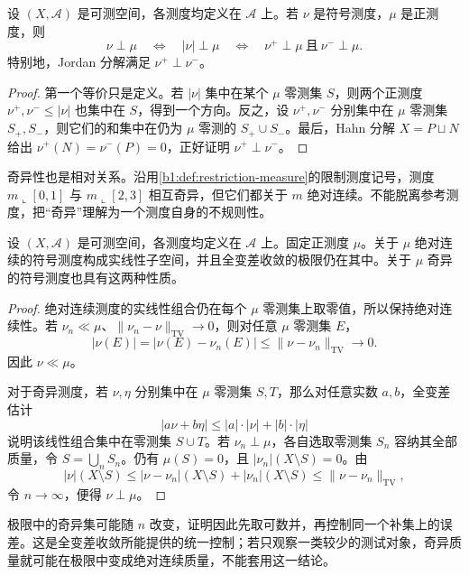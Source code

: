 \begin{proposition}\label{b1:prop:singularity-jordan}
设 \((X,\mathcal A)\) 是可测空间，各测度均定义在 \(\mathcal A\) 上。若 \(\nu\) 是符号测度，\(\mu\) 是正测度，则
\[
\nu\perp\mu\quad\Longleftrightarrow\quad|\nu|\perp\mu
\quad\Longleftrightarrow\quad\nu^+\perp\mu\ \text{且}\ \nu^-\perp\mu.
\]
特别地，Jordan 分解满足 \(\nu^+\perp\nu^-\)。
\end{proposition}
\begin{proof}
第一个等价只是定义。若 \(|\nu|\) 集中在某个 \(\mu\) 零测集 \(S\)，则两个正测度 \(\nu^+,\nu^-\leq|\nu|\) 也集中在 \(S\)，得到一个方向。反之，设 \(\nu^+,\nu^-\) 分别集中在 \(\mu\) 零测集 \(S_+,S_-\)，则它们的和集中在仍为 \(\mu\) 零测的 \(S_+\cup S_-\)。最后，Hahn 分解 \(X=P\sqcup N\) 给出 \(\nu^+(N)=\nu^-(P)=0\)，正好证明 \(\nu^+\perp\nu^-\)。
\end{proof}

奇异性也是相对关系。沿用\cref{b1:def:restriction-measure}的限制测度记号，测度 \(m\llcorner[0,1]\) 与 \(m\llcorner[2,3]\) 相互奇异，但它们都关于 \(m\) 绝对连续。不能脱离参考测度，把“奇异”理解为一个测度自身的不规则性。

\begin{proposition}\label{b1:prop:ac-singular-linear-stability}
设 \((X,\mathcal A)\) 是可测空间，各测度均定义在 \(\mathcal A\) 上。固定正测度 \(\mu\)。关于 \(\mu\) 绝对连续的符号测度构成实线性子空间，并且全变差收敛的极限仍在其中。关于 \(\mu\) 奇异的符号测度也具有这两种性质。
\end{proposition}
\begin{proof}
绝对连续测度的实线性组合仍在每个 \(\mu\) 零测集上取零值，所以保持绝对连续性。若 \(\nu_n\ll\mu\)、\(\|\nu_n-\nu\|_{\mathrm{TV}}\to0\)，则对任意 \(\mu\) 零测集 \(E\)，
\[
|\nu(E)|=|\nu(E)-\nu_n(E)|\leq\|\nu-\nu_n\|_{\mathrm{TV}}\longrightarrow0.
\]
因此 \(\nu\ll\mu\)。

对于奇异测度，若 \(\nu,\eta\) 分别集中在 \(\mu\) 零测集 \(S,T\)，那么对任意实数 \(a,b\)，全变差估计
\[
|a\nu+b\eta|\leq|a|\cdot|\nu|+|b|\cdot|\eta|
\]
说明该线性组合集中在零测集 \(S\cup T\)。若 \(\nu_n\perp\mu\)，各自选取零测集 \(S_n\) 容纳其全部质量，令 \(S=\bigcup_nS_n\)。仍有 \(\mu(S)=0\)，且 \(|\nu_n|(X\setminus S)=0\)。由
\[
|\nu|(X\setminus S)
\leq|\nu-\nu_n|(X\setminus S)+|\nu_n|(X\setminus S)
\leq\|\nu-\nu_n\|_{\mathrm{TV}},
\]
令 \(n\to\infty\)，便得 \(\nu\perp\mu\)。
\end{proof}

极限中的奇异集可能随 \(n\) 改变，证明因此先取可数并，再控制同一个补集上的误差。这是全变差收敛所能提供的统一控制；若只观察一类较少的测试对象，奇异质量就可能在极限中变成绝对连续质量，不能套用这一结论。


